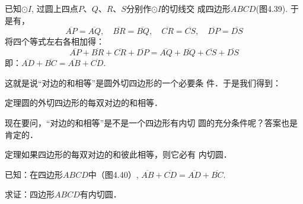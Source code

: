 \begin{figure}[htp]
    \centering
{}
    \caption{}
\end{figure}


已知$\odot I$, 过圆上四点$P$、$Q$、$R$、$S$分别作$\odot I$的切线交
成四边形$ABCD$(图4.39). 于是有，
\begin{equation*}
    \overline{AP}=\overline{AQ},\quad \overline{BR}=\overline{BQ},\quad \overline{CR}=\overline{CS},\quad 
\overline{DP}=\overline{DS}\tag{切线长定理}
\end{equation*}
将四个等式左右各相加得：
\[\overline{AP}+\overline{BR}+\overline{CR}+\overline{DP}=\overline{AQ}+\overline{BQ}+\overline{CS}+\overline{DS}\]
即：$\overline{AD}+\overline{BC}=\overline{AB}+\overline{CD}$.

这就是说“对边的和相等”是圆外切四边形的一个必要条
件．于是我们得到：

\begin{blk}
    {定理}圆的外切四边形的每双对边的和相等．
\end{blk}

现在要问，“对边的和相等”是不是一个四边形有内切
圆的充分条件呢？答案也是肯定的．

\begin{blk}
    {定理}如果四边形的每双对边的和彼此相等，则它必有
内切圆．
\end{blk}

已知：在四边形$ABCD$中（图4.40）, $\overline{AB}+\overline{CD}=\overline{AD}+\overline{BC}$.

求证：四边形$ABCD$有内切圆．


